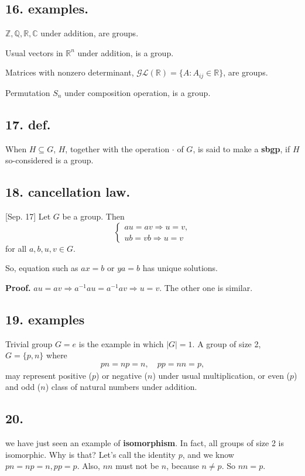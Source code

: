 \documentclass[12pt]{article}
\newcommand\M\cdot%
\newcommand{\Ip}{\Rightarrow} %
\newcommand{\BF}[1]{ \mathbb{#1} }%
\newcommand{\CF}[1]{ \mathcal{#1} }%
\newcommand{\Ss}[1]{\textsf{\textbf{#1}}}%
\newcommand{\EqGo}[1]{ \begin{gather*}{#1}\end{gather*} } %
\begin{document}
\subsection*{16. examples.} \( \BF{Z, Q, R, C} \) under addition, are groups. \par
Usual vectors in \( \BF R^n \) under addition, is a group. \par
Matrices with nonzero determinant, \(\CF {GL}(\BF R) = \{ A: A_{ij} \in \BF R \}\), are groups. \par
Permutation \( S_n \) under composition operation, is a group.

\subsection*{17. def.} When \(H \subseteq G\), \(H\), together with the operation \(\M\) of \(G\), is said to make a \Ss{sbgp}, if \(H\) so-considered is a group. 

\subsection*{18. cancellation law.} [Sep. 17] Let \(G\) be a group. Then \[ \begin{cases}
au=av \Ip u=v, \\
ub=vb \Ip u=v
\end{cases} \] for all \(a,b,u,v \in G\). \par
So, equation such as \(ax=b\) or \(ya=b\) has unique solutions. 

\Ss{Proof.} \( au=av \Ip a^{-1}au = a^{-1}av \Ip u=v \). 
The other one is similar. 

\subsection*{19. examples} Trivial group \(G={e}\) is the example in which \(|G|=1\). 
A group of size 2, \(G= \{ p,n \}\) where \EqGo{
 pn=np=n, \quad pp=nn=p,
} may represent positive (\(p\)) or negative (\(n\)) under usual multiplication, or even (\(p\)) and odd (\(n\)) class of natural numbers under addition. 

\subsection*{20.} we have just seen an example of \Ss{isomorphism}. 
In fact, all groups of size 2 is isomorphic. 
Why is that? Let's call the identity \(p\), and we know \(pn = np = n, pp =p\). 
Also, \(nn\) must not be \(n\), because \(n \neq p\). So \(nn=p\). 
\end{document}
